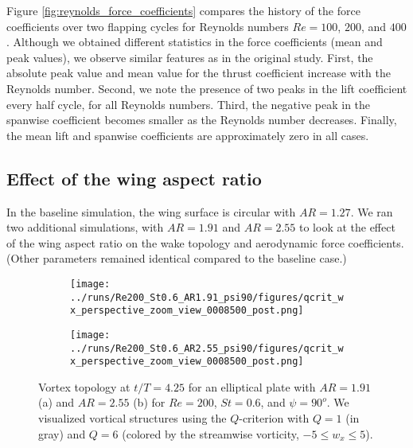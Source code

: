 Figure \ref{fig:reynolds_force_coefficients} compares the history of the force coefficients over two flapping cycles for Reynolds numbers $Re = 100$, $200$, and $400$.
Although we obtained different statistics in the force coefficients (mean and peak values), we observe similar features as in the original study.
First, the absolute peak value and mean value for the thrust coefficient increase with the Reynolds number.
Second, we note the presence of two peaks in the lift coefficient every half cycle, for all Reynolds numbers.
Third, the negative peak in the spanwise coefficient becomes smaller as the Reynolds number decreases.
Finally, the mean lift and spanwise coefficients are approximately zero in all cases.

\subsection{Effect of the wing aspect ratio}

In the baseline simulation, the wing surface is circular with $AR = 1.27$.
We ran two additional simulations, with $AR = 1.91$ and $AR = 2.55$ to look at the effect of the wing aspect ratio on the wake topology and aerodynamic force coefficients.
(Other parameters remained identical compared to the baseline case.)

\begin{figure}
  \centering
  \begin{subfigure}[c]{0.45\textwidth}
    \centering
    \texttt{[image: ../runs/Re200\_St0.6\_AR1.91\_psi90/figures/qcrit\_wx\_perspective\_zoom\_view\_0008500\_post.png]}
    \caption{}
  \end{subfigure}
  \hfill
  \begin{subfigure}[c]{0.45\textwidth}
    \centering
    \texttt{[image: ../runs/Re200\_St0.6\_AR2.55\_psi90/figures/qcrit\_wx\_perspective\_zoom\_view\_0008500\_post.png]}
    \caption{}
  \end{subfigure}
  \caption{Vortex topology at $t / T = 4.25$ for an elliptical plate with $AR = 1.91$ (a) and $AR = 2.55$ (b) for $Re = 200$, $St = 0.6$, and $\psi = 90^o$. We visualized vortical structures using the $Q$-criterion with $Q = 1$ (in gray) and $Q = 6$ (colored by the streamwise vorticity, $-5 \leq w_x \leq 5$).}
  \label{fig:ratio_wake_topology}
\end{figure}

